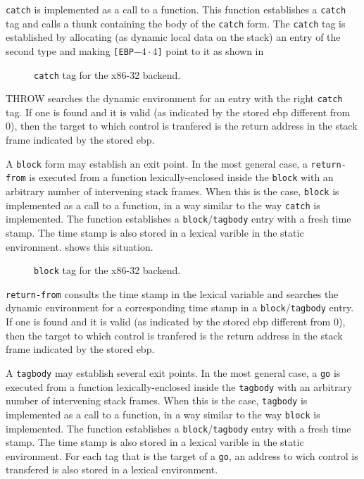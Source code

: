 \texttt{catch} is implemented as a call to a function.  This function
establishes a \texttt{catch} tag and calls a thunk containing the body
of the \texttt{catch} form.  The \texttt{catch} tag is established by
allocating (as dynamic local data on the stack) an entry of the second
type and making \texttt{[EBP$-4 \cdot 4$]} point to it as shown in

\begin{figure}
\begin{center}
\end{center}
\caption{\label{fig-x86-32-catch}
\texttt{catch} tag for the x86-32 backend.}
\end{figure}

THROW searches the dynamic environment for an entry with the right
\texttt{catch} tag.  If one is found and it is valid (as indicated by
the stored ebp different from 0), then the target to which control is
tranfered is the return address in the stack frame indicated by the
stored ebp.

A \texttt{block} form may establish an exit point.  In the most
general case, a \texttt{return-from} is executed from a function
lexically-enclosed inside the \texttt{block} with an arbitrary number
of intervening stack frames.  When this is the case, \texttt{block} is
implemented as a call to a function, in a way similar to the way
\texttt{catch} is implemented.  The function establishes a
\texttt{block}/\texttt{tagbody} entry with a fresh time stamp.  The
time stamp is also stored in a lexical varible in the static
environment.   shows this situation.

\begin{figure}
\begin{center}
\end{center}
\caption{\label{fig-x86-32-block-tag}
\texttt{block} tag for the x86-32 backend.}
\end{figure}

\texttt{return-from} consults the time stamp in the lexical variable
and searches the dynamic environment for a corresponding time stamp in
a \texttt{block}/\texttt{tagbody} entry.  If one is found and it is
valid (as indicated by the stored ebp different from 0), then the
target to which control is tranfered is the return address in the
stack frame indicated by the stored ebp.

A \texttt{tagbody} may establish several exit points.  In the most
general case, a \texttt{go} is executed from a function
lexically-enclosed inside the \texttt{tagbody} with an arbitrary
number of intervening stack frames.  When this is the case,
\texttt{tagbody} is implemented as a call to a function, in a way
similar to the way \texttt{block} is implemented.  The function
establishes a \texttt{block}/\texttt{tagbody} entry with a fresh time
stamp.  The time stamp is also stored in a lexical varible in the
static environment.  For each tag that is the target of a \texttt{go},
an address to wich control is transfered is also stored in a lexical
environment.

